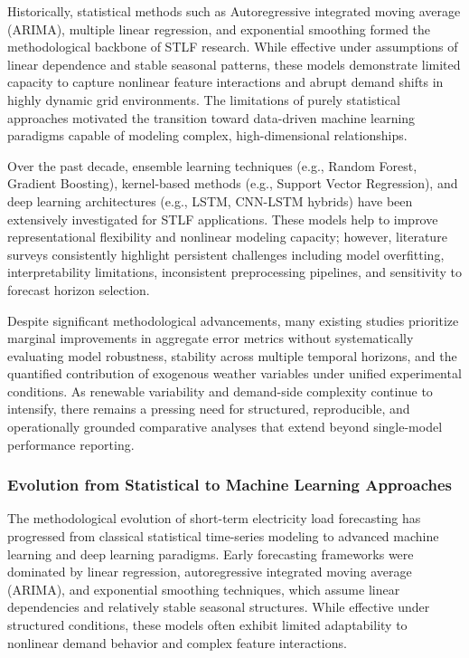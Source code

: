 \documentclass[conference]{IEEEtran}
\begin{document}
Historically, statistical methods such as Autoregressive integrated moving average (ARIMA)\cite{8614252}, multiple linear regression, and exponential smoothing formed the methodological backbone of STLF research. While effective under assumptions of linear dependence and stable seasonal patterns, these models demonstrate limited capacity to capture nonlinear feature interactions and abrupt demand shifts in highly dynamic grid environments. The limitations of purely statistical approaches motivated the transition toward data-driven machine learning paradigms capable of modeling complex, high-dimensional relationships.

Over the past decade, ensemble learning techniques (e.g., Random Forest, Gradient Boosting), kernel-based methods (e.g., Support Vector Regression), and deep learning architectures (e.g., LSTM, CNN-LSTM hybrids) have been extensively investigated for STLF applications\cite{10062299}. These models help to improve representational flexibility and nonlinear modeling capacity; however, literature surveys consistently highlight persistent challenges including model overfitting, interpretability limitations, inconsistent preprocessing pipelines, and sensitivity to forecast horizon selection. 

Despite significant methodological advancements, many existing studies prioritize marginal improvements in aggregate error metrics without systematically evaluating model robustness, stability across multiple temporal horizons, and the quantified contribution of exogenous weather variables under unified experimental conditions. As renewable variability and demand-side complexity continue to intensify, there remains a pressing need for structured, reproducible, and operationally grounded comparative analyses that extend beyond single-model performance reporting.

\subsubsection{Evolution from Statistical to Machine Learning Approaches}

The methodological evolution of short-term electricity load forecasting has progressed from classical statistical time-series modeling to advanced machine learning and deep learning paradigms. Early forecasting frameworks were dominated by linear regression, autoregressive integrated moving average (ARIMA), and exponential smoothing techniques, which assume linear dependencies and relatively stable seasonal structures. While effective under structured conditions, these models often exhibit limited adaptability to nonlinear demand behavior and complex feature interactions\cite{9068850}.
\end{document}
